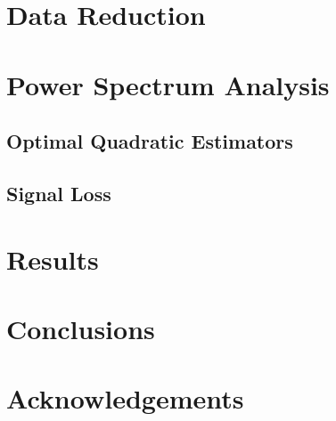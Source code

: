 \documentclass[preprint2,numberedappendix,tighten,twocolappendix]{aastex6}  %
\begin{document}
\section{Data Reduction}
\label{sec:Cal}

\section{Power Spectrum Analysis}
\label{sec:PS}

\subsection{Optimal Quadratic Estimators}
\label{sec:OQE}

\subsection{Signal Loss}
\label{sec:Sigloss}

\section{Results}
\label{sec:Res}

\section{Conclusions}
\label{sec:Con}

\section{Acknowledgements}
\label{sec:Ack}



\end{document}
